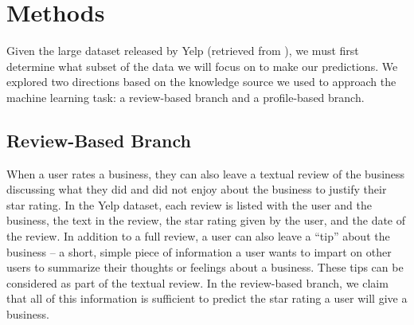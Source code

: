 \section{Methods}

Given the large dataset released by Yelp (retrieved from \cite{yelp-dataset}), we must first determine what subset of the data we will focus on to make our predictions. We explored two directions based on the knowledge source we used to approach the machine learning task: a review-based branch and a profile-based branch.

\subsection{Review-Based Branch}

When a user rates a business, they can also leave a textual review of the business discussing what they did and did not enjoy about the business to justify their star rating. In the Yelp dataset, each review is listed with the user and the business, the text in the review, the star rating given by the user, and the date of the review. In addition to a full review, a user can also leave a ``tip'' about the business -- a short, simple piece of information a user wants to impart on other users to summarize their thoughts or feelings about a business. These tips can be considered as part of the textual review. In the review-based branch, we claim that all of this information is sufficient to predict the star rating a user will give a business.

